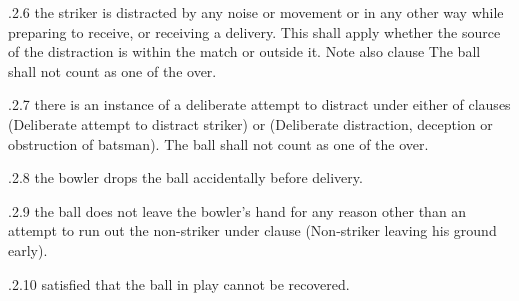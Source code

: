 \documentclass[12pt]{article}
\begin{document}
\vspace{\baselineskip}
\begin{adjustwidth}{1.18in}{0.17in}
{\fontsize{9pt}{10.8pt}.2.6 \tabto{1.17in} the striker is distracted by any noise or movement or in any other way while preparing to receive, or receiving a delivery. This shall apply whether the source of the distraction is within the match or outside it. Note also clause The ball shall not count as one of the over.\par}\par

\end{adjustwidth}


\vspace{\baselineskip}
\begin{adjustwidth}{1.18in}{0.1in}
\begin{justify}
{\fontsize{9pt}{10.8pt}.2.7 \tabto{1.17in} there is an instance of a deliberate attempt to distract under either of clauses (Deliberate attempt to distract striker) or (Deliberate distraction, deception or obstruction of batsman). The ball shall not count as one of the over.\par}
\end{justify}\par

\end{adjustwidth}


\vspace{\baselineskip}
\begin{adjustwidth}{0.49in}{0.0in}
{\fontsize{9pt}{10.8pt}.2.8 \tabto{1.17in} the bowler drops the ball accidentally before delivery.\par}\par

\end{adjustwidth}


\vspace{\baselineskip}
\begin{adjustwidth}{1.18in}{0.22in}
{\fontsize{9pt}{10.8pt}.2.9 \tabto{1.17in} the ball does not leave the bowler’s hand for any reason other than an attempt to run out the non-striker under clause (Non-striker leaving his ground early).\par}\par

\end{adjustwidth}


\vspace{\baselineskip}
\begin{adjustwidth}{0.49in}{0.0in}
{\fontsize{9pt}{10.8pt}.2.10 \tabto{1.17in} satisfied that the ball in play cannot be recovered.\par}\par

\end{adjustwidth}
\end{document}

